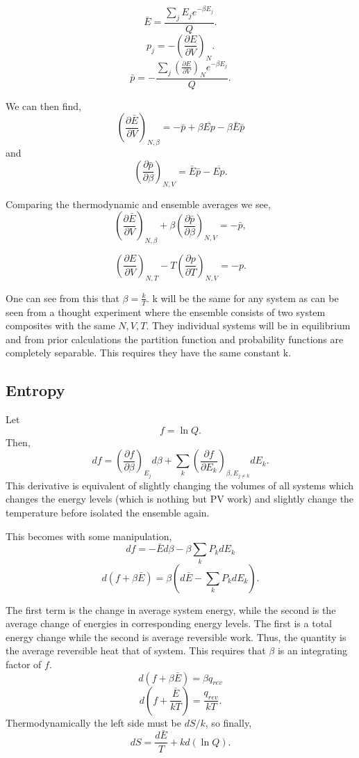 \[\bar{E} = \frac{\sum_{j}{E_j e^{-\beta E_{j}}}}{Q}.\]
\[ p_j = - \left(\frac{\partial E}{\partial V}\right)_N.\]
\[ \bar{p} = - \frac{\sum_j{\left( \frac{\partial E}{\partial V} \right)_{N}
e^{-\beta E_j}}}{Q}.\]

We can then find,
\[ \left( \frac{ \partial \bar{E} }{ \partial V}\right)_{N, \beta} = -\bar{p}
+ \beta \overline{Ep} - \beta \bar{E} \bar{p} \] and
\[ \left( \frac{ \partial \bar{p} }{ \partial \beta }\right)_{N, V} =
\bar{E}\bar{p} - \overline{Ep}.\]

Comparing the thermodynamic and ensemble averages we see,
\[\left( \frac{ \partial \bar{E} }{ \partial V}\right)_{N, \beta} +
\beta \left( \frac{ \partial \bar{p} }{ \partial \beta }\right)_{N, V} =
- \bar{p},\]

\[\left( \frac{ \partial E }{ \partial V}\right)_{N, T} -
T \left( \frac{ \partial p }{ \partial T }\right)_{N, V} = - p.\]

One can see from this that $ \beta = \frac{k}{T} $. k will be the same for any
system as can be seen from a thought experiment where the ensemble consists of
two system composites with the same $N, V, T$. They individual systems will be
in equilibrium and from prior calculations the partition function and
probability functions are completely separable. This requires they have the same
constant k.

\subsection{Entropy}

Let \[f = \ln Q.\] Then, \[ df = \left( \frac{ \partial f }{ \partial \beta }
\right)_{E_{j}} d \beta + \sum_{k}{\left( \frac{ \partial f }{ \partial E_{k}}
\right)_{\beta, E_{j \neq k}} d E_{k}}.\] 
This derivative is equivalent of slightly changing the volumes of all systems
which changes the energy levels (which is nothing but PV work) and slightly
change the temperature before isolated the ensemble again.

This becomes with some manipulation,
\[ df = -\bar{E} d \beta - \beta \sum_{k}{P_{k} dE_{k}} \]
\[ d(f + \beta \bar{E}) = \beta \left( d \bar{E} - \sum_{k}{P_{k} dE_{k}}
\right).\]

The first term is the change in average system energy, while the second is the
average change of energies in corresponding energy levels. The first is a total
energy change while the second is average reversible work. Thus, the quantity is
the average reversible heat that of system. This requires that
$\beta$ is an integrating factor of $f$.  \[ d(f + \beta \bar{E}) = \beta
q_{rev} \]
\[ d\left(f + \frac{ \bar{E} }{kT} \right) = \frac{q_{rev}}{kT}.\]
Thermodynamically the left side must be $ dS/k $, so finally,
\[ dS = \frac{d \bar{E}}{T} + k d( \ln Q).\]

